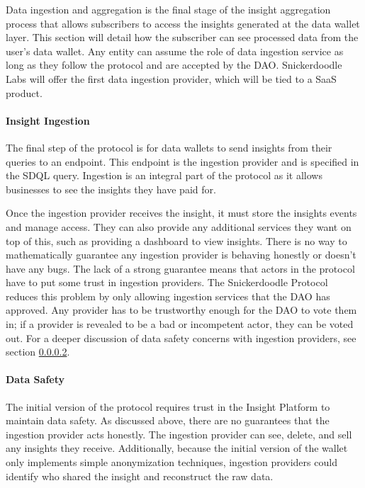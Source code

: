 Data ingestion and aggregation is the final stage of the insight aggregation process that allows subscribers to access the insights generated at the data wallet layer. 
This section will detail how the subscriber can see processed data from the user's data wallet. Any entity can assume the role of data ingestion service 
as long as they follow the protocol and are accepted by the DAO. Snickerdoodle Labs will offer the first data ingestion provider, which will be tied to 
a SaaS product. 

\paragraph{Insight Ingestion}
The final step of the protocol is for data wallets to send insights from their queries to an endpoint. This endpoint is the ingestion provider and is 
specified in the SDQL query. Ingestion is an integral part of the protocol as it allows businesses to see the insights they have paid for.

Once the ingestion provider receives the insight, it must store the insights events and manage access. They can also provide any additional services 
they want on top of this, such as providing a dashboard to view insights. There is no way to mathematically guarantee any ingestion provider is behaving 
honestly or doesn't have any bugs. The lack of a strong guarantee means that actors in the protocol have to put some trust in ingestion providers. The 
Snickerdoodle Protocol reduces this problem by only allowing ingestion services that the DAO has approved. Any provider has to be trustworthy enough for 
the DAO to vote them in; if a provider is revealed to be a bad or incompetent actor, they can be voted out. For a deeper discussion of data safety 
concerns with ingestion providers, see section \ref{section:IngestionDataSafety}.

\paragraph{Data Safety}
\label{section:IngestionDataSafety}

The initial version of the protocol requires trust in the Insight Platform to maintain data safety. As discussed above, there are no guarantees that the 
ingestion provider acts honestly. The ingestion provider can see, delete, and sell any insights they receive. Additionally, because the initial version 
of the wallet only implements simple anonymization techniques, ingestion providers could identify who shared the insight and reconstruct the raw data. 



